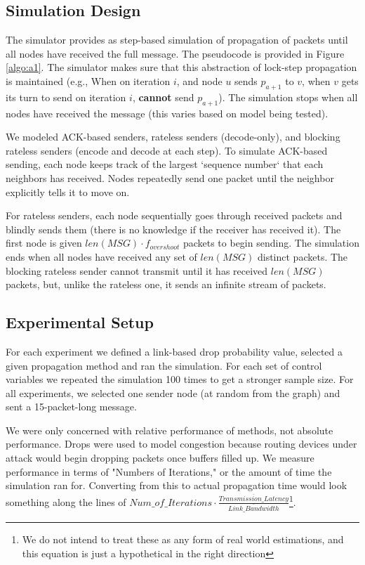 \subsection{Simulation Design}
The simulator provides as step-based simulation of propagation of packets until all nodes have received the full message. The pseudocode is provided in Figure \ref{algo:a1}. The simulator makes sure that this abstraction of lock-step propagation is maintained (e.g., When on iteration $i$, and node $u$ sends $p_{a+1}$ to $v$, when $v$ gets its turn to send on iteration $i$, \textbf{cannot} send $p_{a+1}$). The simulation stops when all nodes have received the message (this varies based on model being tested). 

We modeled ACK-based senders, rateless senders (decode-only), and blocking rateless senders (encode and decode at each step). To simulate ACK-based sending, each node keeps track of the largest `sequence number` that each neighbors has received. Nodes repeatedly send one packet until the neighbor explicitly tells it to move on. 

For rateless senders, each node sequentially goes through received packets and blindly sends them (there is no knowledge if the receiver has received it). The first node is given $len(MSG)\cdot f_{overshoot}$ packets to begin sending. The simulation ends when all nodes have received any set of $len(MSG)$ distinct packets. The blocking rateless sender cannot transmit until it has received $len(MSG)$ packets, but, unlike the rateless one, it sends an infinite stream of packets.

\subsection{Experimental Setup}
For each experiment we defined a link-based drop probability value, selected a given propagation method and ran the simulation. For each set of control variables we repeated the simulation 100 times to get a stronger sample size. For all experiments, we selected one sender node (at random from the graph) and sent a 15-packet-long message.

We were only concerned with relative performance of methods, not absolute performance. Drops were used to model congestion because routing devices under attack would begin dropping packets once buffers filled up. We measure performance in terms of "Numbers of Iterations," or the amount of time the simulation ran for. Converting from this to actual propagation time would look something along the lines of $Num\_of\_Iterations\cdot \frac{\overline{Transmission\_Latency}}{\overline{Link\_Bandwidth}}$\footnote{We do not intend to treat these as any form of real world estimations, and this equation is just a hypothetical in the right direction}.

